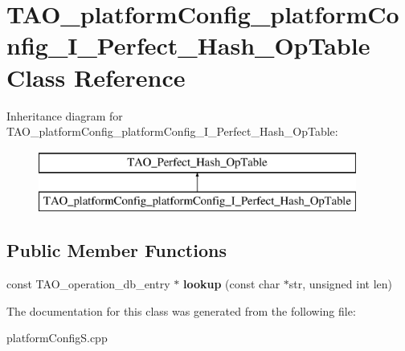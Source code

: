 \section{T\+A\+O\+\_\+platform\+Config\+\_\+platform\+Config\+\_\+\+I\+\_\+\+Perfect\+\_\+\+Hash\+\_\+\+Op\+Table Class Reference}
\label{classTAO__platformConfig__platformConfig__I__Perfect__Hash__OpTable}
Inheritance diagram for T\+A\+O\+\_\+platform\+Config\+\_\+platform\+Config\+\_\+\+I\+\_\+\+Perfect\+\_\+\+Hash\+\_\+\+Op\+Table\+:\begin{figure}[H]
\begin{center}
\leavevmode
\includegraphics[height=2.000000cm]{classTAO__platformConfig__platformConfig__I__Perfect__Hash__OpTable}
\end{center}
\end{figure}
\subsection*{Public Member Functions}
\begin{DoxyCompactItemize}
\item 
const T\+A\+O\+\_\+operation\+\_\+db\+\_\+entry $\ast$ {\bfseries lookup} (const char $\ast$str, unsigned int len)\label{classTAO__platformConfig__platformConfig__I__Perfect__Hash__OpTable_af688f82a0f1f8a31568afa74b729f08a}

\end{DoxyCompactItemize}


The documentation for this class was generated from the following file\+:\begin{DoxyCompactItemize}
\item 
platform\+Config\+S.\+cpp\end{DoxyCompactItemize}
